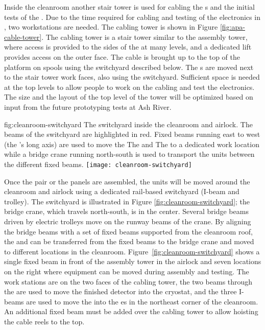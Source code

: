 Inside the cleanroom  another stair tower is used for cabling the s and the initial tests of the . Due to the time required for cabling and testing of the electronics in , %
two workstations are needed. The  cabling tower is shown in Figure \ref{fig:apa-cable-tower}. The  cabling tower is a stair tower similar to the  assembly tower, where access is provided to the sides of the  at many levels, and a dedicated lift provides access on the outer face. The cable is brought up to the top of the platform on spools using the switchyard described below. The s are moved next to the stair tower work faces, also using the switchyard.  Sufficient space is needed at the top levels to allow people to work on the cabling and test the electronics. The size and the layout of the top level of the tower will be optimized based on input from the future prototyping tests %
at Ash River. 

\begin{dunefigure}{fig:cleanroom-switchyard}
  {The switchyard inside the cleanroom and airlock. The beams of the switchyard are highlighted in red. Fixed beams running east to west (the 's long axis) are used to move the The  and The  to a dedicated work location while a bridge crane running north-south is used to transport the units between the different fixed beams. }
\texttt{[image: cleanroom-switchyard]}
\end{dunefigure}

Once the  pair or the  panels are assembled, the units will be moved around the cleanroom and airlock using a dedicated rail-based switchyard (I-beam and trolley). The switchyard is illustrated in Figure \ref{fig:cleanroom-switchyard}; %
the bridge crane, which travels north-south, is in the center. Several bridge beams driven by electric trolleys %
move on the runway beams of the crane.  By aligning the bridge beams with a set of fixed beams supported from the cleanroom roof, the  and  can be transferred from the fixed beams to the bridge crane and %
moved to different locations in the cleanroom. Figure~\ref{fig:cleanroom-switchyard} shows a single fixed beam in front of the  assembly tower in the airlock and seven locations on the right where equipment can be moved during assembly and testing. The work stations are on the two faces of the  cabling tower, the two beams through the  are used to move the finished detector into the cryostat, and the three I-beams  are used to move the  into the \coldbox{}es in the northeast corner of the cleanroom. An additional fixed beam must be added over the cabling tower to allow hoisting the cable reels %
to the top. 

